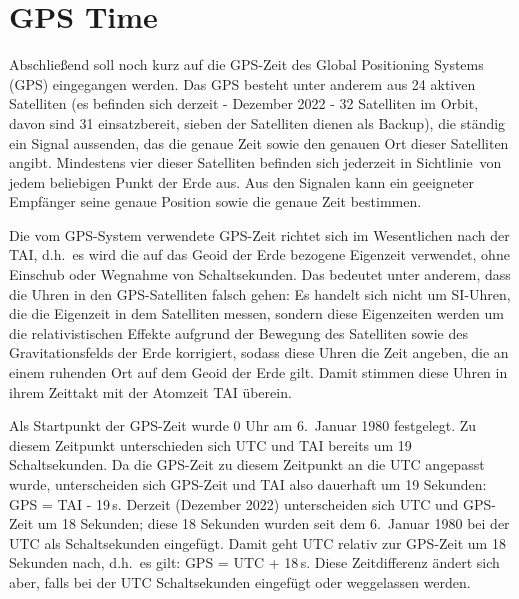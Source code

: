 \section{GPS Time}

Abschlie\ss end soll noch kurz auf die GPS-Zeit 
des Global Positioning Systems (GPS) eingegangen werden. 
Das GPS besteht unter anderem aus 24 aktiven Satelliten (es befinden sich derzeit - Dezember 2022 - 32
Satelliten im Orbit, davon sind 31 einsatzbereit, sieben der Satelliten dienen als Backup), die st\"andig ein
Signal aussenden, das die genaue Zeit sowie den genauen Ort dieser Satelliten angibt. Mindestens vier dieser
Satelliten befinden sich jederzeit in \glqq Sichtlinie\grqq\ von jedem beliebigen Punkt der Erde aus. Aus den
Signalen kann ein geeigneter Empf\"anger seine genaue Position sowie die genaue Zeit bestimmen. 

Die vom GPS-System verwendete GPS-Zeit richtet sich im Wesentlichen nach der TAI, d.h.\ es wird die
auf das Geoid der Erde bezogene Eigenzeit verwendet, ohne Einschub oder Wegnahme von Schaltsekunden. 
Das bedeutet unter anderem, dass die Uhren in den GPS-Satelliten \glqq falsch gehen\grqq: Es handelt sich
nicht um SI-Uhren, die die Eigenzeit in dem Satelliten messen, sondern diese Eigenzeiten werden um die
relativistischen Effekte aufgrund der Bewegung des Satelliten sowie des Gravitationsfelds der Erde
korrigiert, sodass diese Uhren die Zeit angeben, die an einem ruhenden Ort auf dem Geoid der Erde
gilt. Damit stimmen diese Uhren in ihrem Zeittakt mit der Atomzeit TAI \"uberein. 

Als Startpunkt der GPS-Zeit wurde 0 Uhr am 6.\ Januar 1980 festgelegt. Zu diesem Zeitpunkt unterschieden
sich UTC und TAI bereits um 19 Schaltsekunden. Da die GPS-Zeit zu diesem Zeitpunkt an die UTC angepasst
wurde, unterscheiden sich GPS-Zeit und TAI also dauerhaft um 19 Sekunden: GPS = TAI - 19\,s. Derzeit (Dezember
2022) unterscheiden sich UTC und GPS-Zeit um 18 Sekunden; diese 18 Sekunden wurden seit dem 6.\ Januar
1980 bei der UTC als Schaltsekunden eingef\"ugt. Damit geht UTC relativ zur GPS-Zeit um 18 Sekunden nach,
d.h.\ es gilt: GPS = UTC + 18\,s. Diese Zeitdifferenz \"andert sich aber, falls bei der UTC Schaltsekunden eingef\"ugt
oder weggelassen werden.   

